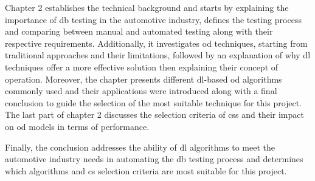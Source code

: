 Chapter 2 establishes the technical background and starts by explaining the importance of \gls{db} testing in the automotive industry, defines the testing process and comparing between manual and automated testing along with their respective requirements. Additionally, it investigates \gls{od} techniques, starting from traditional approaches and their limitations, followed by an explanation of why \gls{dl} techniques offer a more effective solution then explaining their concept of operation. Moreover, the chapter presents different \gls{dl}-based \gls{od} algorithms commonly used and their applications were introduced along with a final conclusion to guide the selection of the most suitable technique for this project. The last part of chapter 2 discusses the selection criteria of \gls{cs}s and their impact on \gls{od} models in terms of performance. 

Finally, the conclusion addresses the ability of \gls{dl} algorithms to meet the automotive industry needs in automating the \gls{db} testing process and determines which algorithms and \gls{cs} selection criteria are most suitable for this project.
